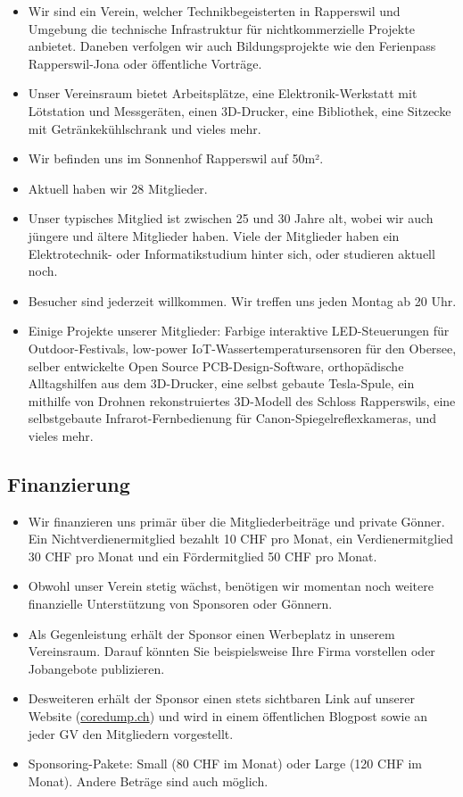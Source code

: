 \documentclass[10pt,a4paper,parskip,fleqn]{scrartcl}
\newcommand{\membercount}{28}
\begin{document}
\begin{itemize}
	\item Wir sind ein Verein, welcher Technikbegeisterten in Rapperswil und
		Umgebung die technische Infrastruktur für nichtkommerzielle Projekte
		anbietet. Daneben verfolgen wir auch Bildungsprojekte wie den Ferienpass
		Rapperswil-Jona oder öffentliche Vorträge.
	\item Unser Vereinsraum bietet Arbeitsplätze, eine Elektronik-Werkstatt mit
		Lötstation und Messgeräten, einen 3D-Drucker, eine Bibliothek, eine Sitzecke
		mit Getränkekühlschrank und vieles mehr.
	\item Wir befinden uns im Sonnenhof Rapperswil auf 50m².
	\item Aktuell haben wir \membercount{} Mitglieder.
	\item Unser typisches Mitglied ist zwischen 25 und 30 Jahre alt, wobei wir
		auch jüngere und ältere Mitglieder haben. Viele der Mitglieder haben ein
		Elektrotechnik- oder Informatikstudium hinter sich, oder studieren aktuell
		noch.
	\item Besucher sind jederzeit willkommen. Wir treffen uns jeden Montag ab 20
		Uhr.
	\item Einige Projekte unserer Mitglieder: Farbige interaktive LED-Steuerungen
		für Outdoor-Festivals, low-power IoT-Wassertemperatursensoren für den
		Obersee, selber entwickelte Open Source PCB-Design-Software, orthopädische
		Alltagshilfen aus dem 3D-Drucker, eine selbst gebaute Tesla-Spule, ein
		mithilfe von Drohnen rekonstruiertes 3D-Modell des Schloss Rapperswils, eine
		selbstgebaute Infrarot-Fernbedienung für Canon-Spiegelreflexkameras, und
		vieles mehr.
\end{itemize}

\subsection{Finanzierung}

\begin{itemize}
	\item Wir finanzieren uns primär über die Mitgliederbeiträge und private
		Gönner. Ein Nichtverdienermitglied bezahlt 10 CHF pro Monat, ein
		Verdienermitglied 30 CHF pro Monat und ein Fördermitglied 50 CHF pro Monat.
	\item Obwohl unser Verein stetig wächst, benötigen wir momentan noch weitere
		finanzielle Unterstützung von Sponsoren oder Gönnern.
	\item Als Gegenleistung erhält der Sponsor einen Werbeplatz in unserem
		Vereinsraum. Darauf könnten Sie beispielsweise Ihre Firma vorstellen oder
		Jobangebote publizieren.
	\item Desweiteren erhält der Sponsor einen stets sichtbaren Link auf unserer
		Website (\url{coredump.ch}) und wird in einem öffentlichen Blogpost sowie an
		jeder GV den Mitgliedern vorgestellt.
	\item Sponsoring-Pakete: Small (80 CHF im Monat) oder Large (120 CHF im
		Monat). Andere Beträge sind auch möglich.
\end{itemize}
\end{document}
